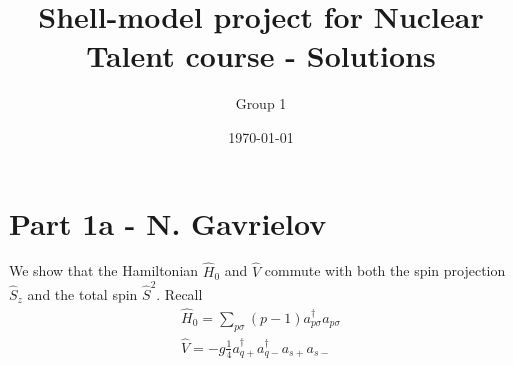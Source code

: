\documentclass[aps,prl,groupedaddress]{revtex4-1}  %
\begin{document}
\title{Shell-model project for Nuclear Talent course - Solutions}


\author{Group 1}
\affiliation{}


\date{\today}

\begin{abstract}
\end{abstract}

\pacs{}

\maketitle
\section{Part 1a - N. Gavrielov}
We show that the Hamiltonian $\hat{H}_0$ and $\hat{V}$ commute with both the spin projection $\hat{S}_z$ and the total spin $\hat{S}^2$.
Recall 
\begin{align*}
\hat{H}_0=\sum_{p\sigma}(p-1)a^\dagger_{p\sigma}a_{p\sigma}\\
\hat{V}=-g\frac{1}{4}a^\dagger_{q+}a^\dagger_{q-}a_{s+}a_{s-}
\end{align*}
\end{document}

